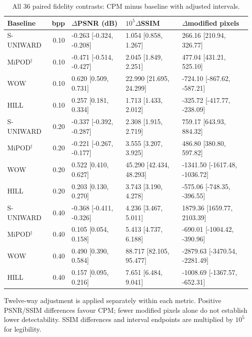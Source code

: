 \documentclass[journal]{IEEEtran}
\renewcommand{\arraystretch}{1.2}
\renewcommand{\arraystretch}{1.0}
\theoremstyle{definition}
\theoremstyle{game}
\renewcommand{\arraystretch}{1.5}
\begin{document}
\begin{table}[!t]
\centering\scriptsize
\caption{All 36 paired fidelity contrasts: CPM minus baseline with adjusted intervals.}
\label{tab:hsm-fidelity-contrasts}
\setlength{\tabcolsep}{4pt}\renewcommand{\arraystretch}{1.15}
\begin{tabular}{lrlll}
\toprule
Baseline & bpp & $\Delta$PSNR (dB) & $10^5\Delta$SSIM & $\Delta$modified pixels\\
\midrule
S-UNIWARD & 0.10 & -0.263 [-0.324, -0.208] & 1.054 [0.858, 1.267] & 266.16 [210.94, 326.77]\\
MiPOD$^\dagger$ & 0.10 & -0.471 [-0.514, -0.427] & 2.045 [1.849, 2.251] & 477.04 [431.21, 525.10]\\
WOW & 0.10 & 0.620 [0.509, 0.731] & 22.990 [21.695, 24.299] & -724.10 [-867.62, -587.21]\\
HILL & 0.10 & 0.257 [0.181, 0.334] & 1.713 [1.433, 2.012] & -325.72 [-417.77, -238.09]\\
S-UNIWARD & 0.20 & -0.337 [-0.392, -0.287] & 2.308 [1.915, 2.719] & 759.17 [643.93, 884.32]\\
MiPOD$^\dagger$ & 0.20 & -0.221 [-0.267, -0.177] & 3.555 [3.207, 3.925] & 486.80 [380.80, 597.82]\\
WOW & 0.20 & 0.522 [0.410, 0.627] & 45.290 [42.434, 48.293] & -1341.50 [-1617.48, -1036.72]\\
HILL & 0.20 & 0.203 [0.130, 0.270] & 3.743 [3.190, 4.278] & -575.06 [-748.35, -396.55]\\
S-UNIWARD & 0.40 & -0.368 [-0.411, -0.326] & 4.236 [3.467, 5.011] & 1879.36 [1659.77, 2103.39]\\
MiPOD$^\dagger$ & 0.40 & 0.105 [0.054, 0.158] & 5.413 [4.737, 6.188] & -690.01 [-1004.42, -390.96]\\
WOW & 0.40 & 0.490 [0.390, 0.584] & 88.717 [82.105, 95.477] & -2879.63 [-3470.54, -2281.49]\\
HILL & 0.40 & 0.157 [0.095, 0.216] & 7.651 [6.484, 9.041] & -1008.69 [-1367.57, -652.31]\\
\bottomrule
\end{tabular}
\par\smallskip\parbox{.97\textwidth}{\footnotesize Twelve-way adjustment is applied separately within each metric. Positive PSNR/SSIM differences favour CPM; fewer modified pixels alone do not establish lower detectability. SSIM differences and interval endpoints are multiplied by $10^5$ for legibility.}
\end{table}
\end{document}
